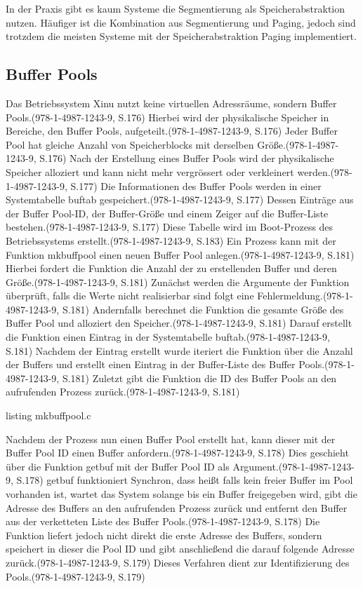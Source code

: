 In der Praxis gibt es kaum Systeme die Segmentierung als Speicherabstraktion nutzen. Häufiger ist die Kombination aus Segmentierung und Paging, jedoch sind trotzdem die meisten Systeme mit der Speicherabstraktion Paging implementiert.

\subsection{Buffer Pools}
\label{subsec:BufferPools}
Das Betriebssystem Xinu nutzt keine virtuellen Adressräume, sondern Buffer Pools.(978-1-4987-1243-9, S.176) Hierbei wird der physikalische Speicher in Bereiche, den Buffer Pools, aufgeteilt.(978-1-4987-1243-9, S.176) Jeder Buffer Pool hat gleiche Anzahl von Speicherblocks mit derselben Größe.(978-1-4987-1243-9, S.176) Nach der Erstellung eines Buffer Pools wird der physikalische Speicher alloziert und kann nicht mehr vergrössert oder verkleinert werden.(978-1-4987-1243-9, S.177) Die Informationen des Buffer Pools werden in einer Systemtabelle buftab gespeichert.(978-1-4987-1243-9, S.177) Dessen Einträge aus der Buffer Pool-ID, der Buffer-Größe und einem Zeiger auf die Buffer-Liste bestehen.(978-1-4987-1243-9, S.177)  Diese Tabelle wird im Boot-Prozess des Betriebssystems erstellt.(978-1-4987-1243-9, S.183)
Ein Prozess kann mit der Funktion mkbuffpool einen neuen Buffer Pool anlegen.(978-1-4987-1243-9, S.181) Hierbei fordert die Funktion die Anzahl der zu erstellenden Buffer und deren Größe.(978-1-4987-1243-9, S.181) Zunächst werden die Argumente der Funktion überprüft, falls die Werte nicht realisierbar sind folgt eine Fehlermeldung.(978-1-4987-1243-9, S.181) Andernfalls berechnet die Funktion die gesamte Größe des Buffer Pool und alloziert den Speicher.(978-1-4987-1243-9, S.181) Darauf erstellt die Funktion einen Eintrag in der Systemtabelle buftab.(978-1-4987-1243-9, S.181) Nachdem der Eintrag erstellt wurde iteriert die Funktion über die Anzahl der Buffers und erstellt einen Eintrag in der Buffer-Liste des Buffer Pools.(978-1-4987-1243-9, S.181) Zuletzt gibt die Funktion die ID des Buffer Pools an den aufrufenden Prozess zurück.(978-1-4987-1243-9, S.181)

listing mkbuffpool.c

Nachdem der Prozess nun einen Buffer Pool erstellt hat, kann dieser mit der Buffer Pool ID einen Buffer anfordern.(978-1-4987-1243-9, S.178) Dies geschieht über die Funktion getbuf mit der Buffer Pool ID als Argument.(978-1-4987-1243-9, S.178) getbuf funktioniert Synchron, dass heißt falls kein freier Buffer im Pool vorhanden ist, wartet das System solange bis ein Buffer freigegeben wird, gibt die Adresse des Buffers an den aufrufenden Prozess zurück und entfernt den Buffer aus der verketteten Liste des Buffer Pools.(978-1-4987-1243-9, S.178)  Die Funktion liefert jedoch nicht direkt die erste Adresse des Buffers, sondern speichert in dieser die Pool ID und gibt anschließend die darauf folgende Adresse zurück.(978-1-4987-1243-9, S.179) Dieses Verfahren dient zur Identifizierung des Pools.(978-1-4987-1243-9, S.179) 

